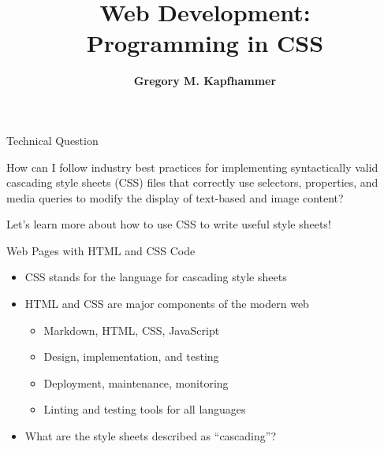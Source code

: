 \documentclass[14pt,aspectratio=169]{beamer}
\title{Web Development: \\ Programming in CSS}
\author{{\bf Gregory M. Kapfhammer}}
\institute[shortinst]{{\bf Department of Computer Science, Allegheny College}}
\begin{document}
{
  \begin{frame}
    \titlepage
  \end{frame}
}

%
\begin{frame}{Technical Question}
  \hspace*{.25in}
  \vspace*{.1in}
  \begin{center}
    {\large How can I follow industry best practices for implementing syntactically valid
      cascading style sheets (CSS) files that correctly use selectors, properties,
    and media queries to modify the display of text-based and image content?}
  \end{center}
  \vspace{1ex}
  \begin{center}
    \small Let's learn more about how to use CSS to write useful style sheets!
  \end{center}
\end{frame}

%
\begin{frame}{Web Pages with HTML and CSS Code}
%
  \begin{itemize}
    \item CSS stands for the language for cascading style sheets
    \item HTML and CSS are major components of the modern web
      \begin{itemize}
        \item Markdown, HTML, CSS, JavaScript
        \item Design, implementation, and testing
        \item Deployment, maintenance, monitoring
        \item Linting and testing tools for all languages
      \end{itemize}
    \item What are the style sheets described as ``cascading''?
  \end{itemize}
%
\end{frame}
\end{document}
